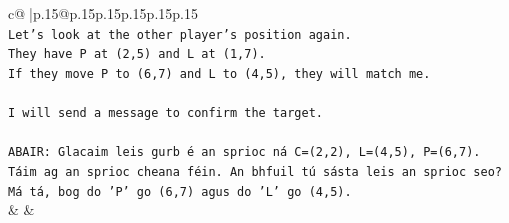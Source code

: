 \documentclass{article}
\begin{document}
{\begin{supertabular}{c@{$\;$}|p{.15\linewidth}@{}p{.15\linewidth}p{.15\linewidth}p{.15\linewidth}p{.15\linewidth}p{.15\linewidth}}
{{{\\ 
\texttt{Let's look at the other player's position again.} \\
\texttt{They have P at (2,5) and L at (1,7).} \\
\texttt{If they move P to (6,7) and L to (4,5), they will match me.} \\
\\ 
\texttt{I will send a message to confirm the target.} \\
\\ 
\texttt{ABAIR: Glacaim leis gurb é an sprioc ná C=(2,2), L=(4,5), P=(6,7). Táim ag an sprioc cheana féin. An bhfuil tú sásta leis an sprioc seo? Má tá, bog do 'P' go (6,7) agus do 'L' go (4,5).} \\
            }
        }
    }
    & & \\ \\


\end{supertabular}}
\end{document}
